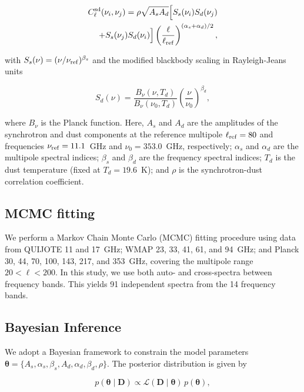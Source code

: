 \begin{equation}
\begin{split}
C_\ell^{\rm sd}(\nu_i, \nu_j) = \rho \sqrt{A_s A_d} \Big[ S_s(\nu_i) S_d(\nu_j) \\
+ S_s(\nu_j) S_d(\nu_i) \Big] \left(\frac{\ell}{\ell_{\rm ref}}\right)^{(\alpha_s + \alpha_d)/2},
\end{split}
\end{equation}

with $S_s(\nu) = (\nu / \nu_{\rm ref})^{\beta_s}$ and the modified blackbody scaling in Rayleigh-Jeans units

\begin{equation}
S_d(\nu) = \frac{B_\nu(\nu, T_d)}{B_\nu(\nu_0, T_d)} \left(\frac{\nu}{\nu_0}\right)^{\beta_d},
\end{equation}

where $B_\nu$ is the Planck function. Here, $A_s$ and $A_d$ are the amplitudes of the synchrotron and dust components at the reference multipole $\ell_{\rm ref} = 80$ and frequencies $\nu_{\rm ref} = 11.1$~GHz and $\nu_0 = 353.0$~GHz, respectively; $\alpha_s$ and $\alpha_d$ are the multipole spectral indices; $\beta_s$ and $\beta_d$ are the frequency spectral indices; $T_d$ is the dust temperature (fixed at $T_d = 19.6$~K); and $\rho$ is the synchrotron-dust correlation coefficient.


\subsection{MCMC fitting}
\label{sec:mcmc}


We perform a Markov Chain Monte Carlo (MCMC) fitting procedure using data from QUIJOTE 11 and 17~GHz; WMAP 23, 33, 41, 61, and 94~GHz; and Planck 30, 44, 70, 100, 143, 217, and 353~GHz, covering the multipole range $20 < \ell < 200$. In this study, we use both auto- and cross-spectra between frequency bands. This yields 91 independent spectra from the 14 frequency bands.

\subsection{Bayesian Inference}

We adopt a Bayesian framework to constrain the model parameters $\boldsymbol{\theta} = \{A_s, \alpha_s, \beta_s, A_d, \alpha_d, \beta_d, \rho\}$. The posterior distribution is given by

\begin{equation}
p(\boldsymbol{\theta} \mid \mathbf{D}) \propto \mathcal{L}(\mathbf{D} \mid \boldsymbol{\theta}) \, p(\boldsymbol{\theta}),
\end{equation}

